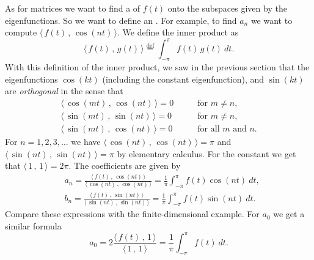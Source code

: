As for matrices we want to find a \emph{}
of $f(t)$ onto the subspaces given by the eigenfunctions.  So we want to
define an \emph{}.  For example, to
find $a_n$ we want to compute $\langle \, f(t) \, , \, \cos (nt) \, \rangle$.
We define the inner product as
\begin{equation*}
\langle \, f(t)\, , \, g(t) \, \rangle \overset{\text{def}}{=}
\int_{-\pi}^\pi f(t) \, g(t) ~ dt .
\end{equation*}
With this definition of the inner product,
we saw in the previous section that the eigenfunctions $\cos (kt)$
(including the constant eigenfunction), and
$\sin (kt)$ are \emph{orthogonal} in the sense
that
\begin{align*}
\langle \, \cos (mt)\, , \, \cos (nt) \, \rangle = 0 & \qquad \text{for } m \not= n , \\
\langle \, \sin (mt)\, , \, \sin (nt) \, \rangle = 0 & \qquad \text{for } m \not= n , \\
\langle \, \sin (mt)\, , \, \cos (nt) \, \rangle = 0 & \qquad \text{for all } m \text{ and } n .
\end{align*}
For $n=1,2,3,\ldots$
we have $\langle \, \cos (nt) \, , \, \cos (nt) \, \rangle = \pi$
and $\langle \, \sin (nt) \, , \, \sin (nt) \, \rangle = \pi$ by elementary
calculus.  For the constant we get
that $\langle \, 1 \, , \, 1 \, \rangle = 2\pi$.
The coefficients are given by
\begin{equation*}
\boxed{~~
\begin{aligned}
& a_n =
\frac{\langle \, f(t) \, , \, \cos (nt) \, \rangle}{\langle \, \cos (nt) \, , \,
\cos (nt) \, \rangle}
= 
\frac{1}{\pi} \int_{-\pi}^\pi f(t) \cos (nt) ~ dt , \\
& b_n =
\frac{\langle \, f(t) \, , \, \sin (nt) \, \rangle}{\langle \, \sin (nt) \, , \,
\sin (nt) \, \rangle}
= 
\frac{1}{\pi} \int_{-\pi}^\pi f(t) \sin (nt) ~ dt .
\end{aligned}
~~}
\end{equation*}
Compare these expressions with the finite-dimensional example.
For $a_0$ we get a similar formula
\begin{equation*}
\boxed{~~
a_0 = 2
\frac{\langle \, f(t) \, , \, 1 \, \rangle}{\langle \, 1 \, , \,
1 \, \rangle}
=
\frac{1}{\pi} \int_{-\pi}^\pi f(t) ~ dt .
~~}
\end{equation*}

